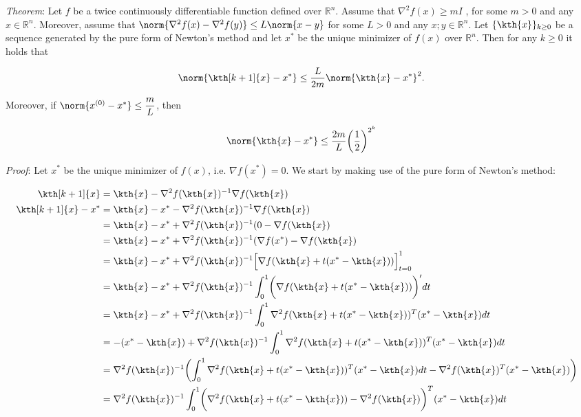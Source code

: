 \documentclass[12pt,a4paper]{article}
\begin{document}
\textit{Theorem}: Let $f$ be a twice continuously differentiable function defined over $\mathbb{R}^n$. Assume that $\nabla^2 f(x) \geq mI$ , for some $m > 0$ and any $x \in \mathbb{R}^n$. Moreover, assume that $\norm{\nabla^2 f(x) - \nabla^2 f(y)} \leq L\norm{x -y } $ for some $L > 0$ and any $x; y \in \mathbb{R}^n$. Let $\{\kth{x}\}_{k\geq0}$ be a sequence generated by the pure
form of Newton’s method and let $x^{*}$ be the unique minimizer of $f(x)$ over $\mathbb{R}^n $. Then for any $k \geq 0$ it holds that

\begin{equation*}
    \norm{\kth[k+1]{x} - x^{*}} \leq  \dfrac{L}{2m} \norm{\kth{x} - x^{*}}^{2}. 
\end{equation*}

Moreover, if $\norm{x^{(0)} - x^{*}} \leq \dfrac{m}{L}$, then

\begin{equation*}
    \norm{\kth{x} - x^{*}} \leq  \dfrac{2m}{L} \biggl(\dfrac{1}{2}\biggr)^{2^{k}}
\end{equation*}

\textit{Proof}: Let $x^{*}$ be the unique minimizer of $f(x)$, i.e. $\nabla f(x^{*}) = 0$. We start by making use of the
pure form of Newton’s method:

\begin{align}
    \kth[k+1]{x}  &= \kth{x}  - \nabla^2 f(\kth{x})^{-1}\nabla f(\kth{x})
    \\ \kth[k+1]{x} - x^{*} &= \kth{x}  - x^{*} - \nabla^2 f(\kth{x})^{-1}\nabla f(\kth{x}) 
    \\ &= \kth{x} - x^{*}  + \nabla^2 f(\kth{x})^{-1} ( 0 - \nabla f(\kth{x})   
    \\ &= \kth{x} - x^{*}  + \nabla^2 f(\kth{x})^{-1} ( \nabla f(x^{*}) - \nabla f(\kth{x})    
    \\ &= \kth{x} - x^{*}  + \nabla^2 f(\kth{x})^{-1} \Bigl[ \nabla f(\kth{x} + t(x^{*}-\kth{x})) \Bigr]_{t=0}^1
    \\ &= \kth{x} - x^{*}  + \nabla^2 f(\kth{x})^{-1} \int_{0}^{1} \biggl(\nabla f(\kth{x} + t(x^{*}-\kth{x}))\biggr)'dt
    \\ &= \kth{x} - x^{*}  + \nabla^2 f(\kth{x})^{-1} \int_{0}^{1} \nabla^2 f(\kth{x} + t(x^{*}-\kth{x}))^T(x^{*} - \kth{x})dt
    \\ &= -( x^{*} - \kth{x})  + \nabla^2 f(\kth{x})^{-1} \int_{0}^{1} \nabla^2 f(\kth{x} + t(x^{*}-\kth{x}))^T(x^{*} - \kth{x})dt
    \\ &= \nabla^2 f(\kth{x})^{-1}\biggl( \int_{0}^{1} \nabla^2 f(\kth{x} + t(x^{*}-\kth{x}))^T(x^{*} - \kth{x})dt - \nabla^2 f(\kth{x})^T( x^{*} - \kth{x})\biggr)
    \\ &= \nabla^2 f(\kth{x})^{-1} \int_{0}^{1} \biggl(\nabla^2 f(\kth{x} + t(x^{*}-\kth{x})) - \nabla^2  f(\kth{x})\biggr)^T(x^{*} - \kth{x})dt &
\end{align}
\end{document}
